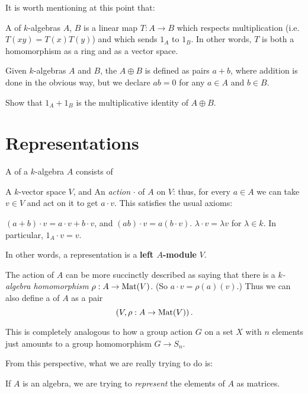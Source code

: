 It is worth mentioning at this point that:
\begin{definition}
	A  of $k$-algebras $A$, $B$ is a
	linear map $T : A \to B$ which respects multiplication
	(i.e.\ $T(xy) = T(x)T(y)$) and which sends $1_A$ to $1_B$.
	In other words, $T$ is both a homomorphism as a ring and as a vector space.
\end{definition}
\begin{definition}
	Given $k$-algebras $A$ and $B$, the  $A \oplus B$
	is defined as pairs $a + b$, where addition is done in the obvious way,
	but we declare $ab = 0$ for any $a \in A$ and $b \in B$.
\end{definition}
\begin{ques}
	Show that $1_A + 1_B$ is the multiplicative identity of $A \oplus B$.
\end{ques}

\section{Representations}

\begin{definition}
	A  of a $k$-algebra $A$ consists of
	\begin{enumerate}[(i)]
		\ii A $k$-vector space $V$, and
		\ii An \emph{action} $\cdot$ of $A$ on $V$: thus, for every $a \in A$
		we can take $v \in V$ and act on it to get $a \cdot v$.
		This satisfies the usual axioms:
		\begin{itemize}
			\ii $(a+b) \cdot v = a \cdot v + b \cdot v$,
			and $(ab) \cdot v = a(b \cdot v)$.
			\ii $\lambda \cdot v = \lambda v$ for $\lambda \in k$.
			In particular, $1_A \cdot v = v$.
		\end{itemize}
	\end{enumerate}
	In other words, a representation is a \textbf{left $A$-module} $V$.
\end{definition}

\begin{definition}
	The action of $A$ can be more succinctly described as saying
	that there is a \emph{$k$-algebra homomorphism} $\rho : A \to \mathrm{Mat}(V)$.
	(So $a \cdot v = \rho(a)(v)$.)
	Thus we can also define a  of $A$ as a pair
	\[ \left( V, \rho : A \to \mathrm{Mat}(V) \right). \]
\end{definition}
\begin{remark}
	This is completely analogous to how a group action $G$ on a set $X$
	with $n$ elements just amounts to a group homomorphism $G \to S_n$.
\end{remark}
From this perspective, what we are really trying to do is:
\begin{moral}
	If $A$ is an algebra,
	we are trying to \emph{represent}
	the elements of $A$ as matrices.
\end{moral}

